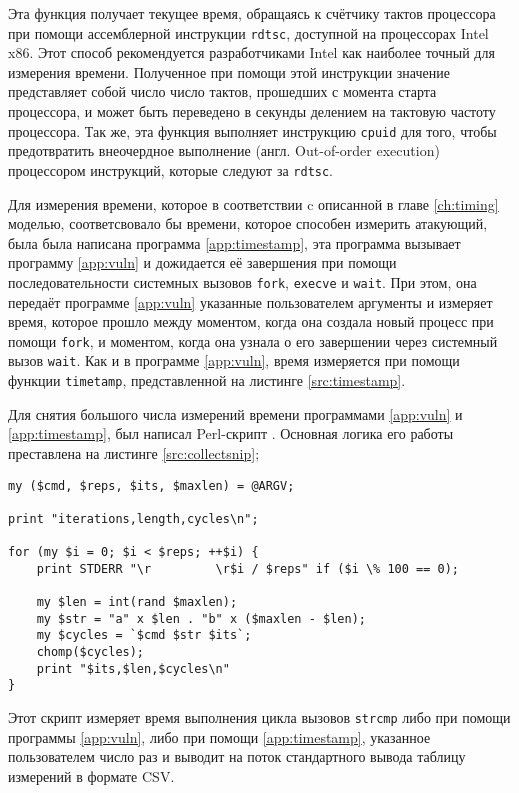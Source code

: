 Эта функция получает текущее время, обращаясь к счётчику тактов процессора при
помощи ассемблерной инструкции \texttt{rdtsc}, доступной на процессорах Intel x86.
Этот способ рекомендуется разработчиками Intel \cite{rdtsc} как наиболее точный для измерения
времени. Полученное при помощи этой инструкции значение представляет собой число
число тактов, прошедших с момента старта процессора, и может быть переведено в
секунды делением на тактовую частоту процессора. Так же, эта функция выполняет инструкцию
\texttt{cpuid} для того, чтобы предотвратить внеочердное выполнение
(англ. Out-of-order execution) процессором инструкций, которые следуют за \texttt{rdtsc}.

Для измерения времени, которое в соответствии c описанной в главе \ref{ch:timing}
моделью, соответсвовало бы времени, которое способен измерить атакующий, была
была написана программа \ref{app:timestamp}, эта программа вызывает программу
\ref{app:vuln} и дожидается её завершения при помощи последовательности системных
вызовов \texttt{fork}, \texttt{execve} и \texttt{wait}. При этом, она передаёт
программе \ref{app:vuln} указанные пользователем аргументы и измеряет время, которое
прошло между моментом, когда она создала новый процесс при помощи \texttt{fork},
и моментом, когда она узнала о его завершении через системный вызов \texttt{wait}.
Как и в программе \ref{app:vuln}, время измеряется при помощи функции \texttt{timetamp},
представленной на листинге \ref{src:timestamp}.

Для снятия большого числа измерений времени программами \ref{app:vuln} и
\ref{app:timestamp}, был написал Perl-скрипт . Основная логика его
работы преставлена на листинге \ref{src:collectsnip};

\begin{lstlisting}
my ($cmd, $reps, $its, $maxlen) = @ARGV;

print "iterations,length,cycles\n";

for (my $i = 0; $i < $reps; ++$i) {
	print STDERR "\r         \r$i / $reps" if ($i \% 100 == 0);

	my $len = int(rand $maxlen);
	my $str = "a" x $len . "b" x ($maxlen - $len);
	my $cycles = `$cmd $str $its`;
	chomp($cycles);
	print "$its,$len,$cycles\n"
}
\end{lstlisting} \label{src:collectsnip}

Этот скрипт измеряет время выполнения цикла вызовов \texttt{strcmp} либо при помощи
программы \ref{app:vuln}, либо при помощи \ref{app:timestamp}, указанное пользователем
число раз и выводит на поток стандартного вывода таблицу измерений в формате CSV.

